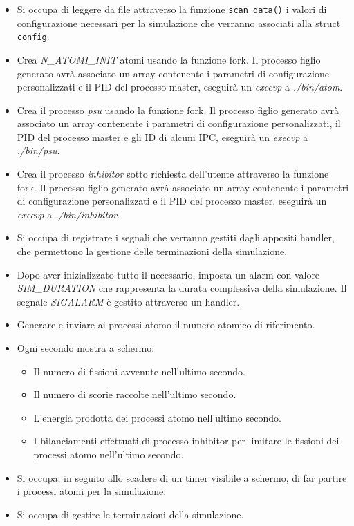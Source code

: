 \begin{itemize}
    \item Si occupa di leggere da file attraverso la funzione \lstinline{scan_data()} i valori di configurazione necessari per la simulazione che verranno associati alla struct \lstinline{config}. 
    \item Crea \textit{N\_ATOMI\_INIT} atomi usando la funzione fork. Il processo figlio generato avrà associato un array contenente i parametri di configurazione personalizzati e il PID del processo master, eseguirà un \textit{execvp} a \textit{./bin/atom}.
    \item Crea il processo \textit{psu} usando la funzione fork. Il processo figlio generato avrà associato un array contenente i parametri di configurazione personalizzati, il PID del processo master e gli ID di alcuni IPC, eseguirà un \textit{execvp} a \textit{./bin/psu}. 
    \item Crea il processo \textit{inhibitor} sotto richiesta dell'utente attraverso la funzione fork. Il processo figlio generato avrà associato un array contenente i parametri di configurazione personalizzati e il PID del processo master, eseguirà un \textit{execvp} a \textit{./bin/inhibitor}.
    \item Si occupa di registrare i segnali che verranno gestiti dagli appositi handler, che permettono la gestione delle terminazioni della simulazione. 
    \item Dopo aver inizializzato tutto il necessario, imposta un alarm con valore \textit{SIM\_DURATION} che rappresenta la durata complessiva della simulazione. Il segnale \textit{SIGALARM} è gestito attraverso un handler.
    \item Generare e inviare ai processi atomo il numero atomico di riferimento. 
    \item Ogni secondo mostra a schermo: 
    \begin{itemize}
        \item Il numero di fissioni avvenute nell'ultimo secondo. 
        \item Il numero di scorie raccolte nell'ultimo secondo.
        \item L'energia prodotta dei processi atomo nell'ultimo secondo.
        \item I bilanciamenti effettuati di processo inhibitor per limitare le fissioni dei processi atomo nell'ultimo secondo. 
    \end{itemize}
    \item Si occupa, in seguito allo scadere di un timer visibile a schermo, di far partire i processi atomi per la simulazione. 
    \item Si occupa di gestire le terminazioni della simulazione.
\end{itemize}
